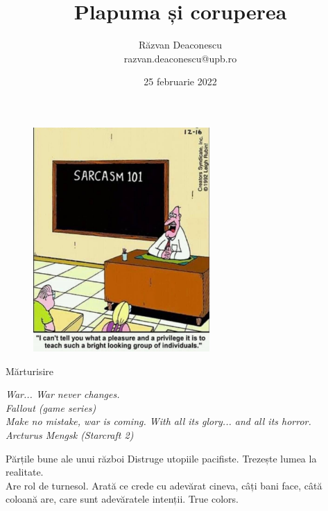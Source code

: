 \documentclass{simple}
\title[Plapuma și coruperea]{Plapuma și coruperea}
\institute{Excursie PRECIS 708 și prietenii}
\author[Răzvan Deaconescu]{Răzvan Deaconescu \\
razvan.deaconescu@upb.ro}
\date{25 februarie 2022}
\begin{document}
\frame{\titlepage}

\begin{frame}{}
  \begin{figure}
    \centering
    \pause
    \includegraphics[width=0.6\textwidth]{img/sarcasm101.jpg}
  \end{figure}
\end{frame}

\begin{frame}{}
  \centering
  \Large{Mărturisire}
\end{frame}

\begin{frame}{}
  \pause
  \centering
  \LARGE{\textit{War... War never changes.}} \\
  \vspace{3mm}
  \hfill \normalsize{\textit{Fallout (game series)}} \\
  \vspace{1cm}
  \pause
  \centering
  \LARGE{\textit{Make no mistake, war is coming. With all its glory... and all its horror.}} \\
  \vspace{3mm}
  \hfill \normalsize{\textit{Arcturus Mengsk (Starcraft 2)}} \\
\end{frame}

\begin{frame}{Părțile bune ale unui război}
  \pause
  \centering
  \LARGE{Distruge utopiile pacifiste. Trezește lumea la realitate.} \\
  \vspace{1cm}
  \pause
  \centering
  \LARGE{Are rol de turnesol. Arată ce crede cu adevărat cineva, câți bani face, câtă coloană are, care sunt adevăratele intenții. True colors.}
\end{frame}
\end{document}
